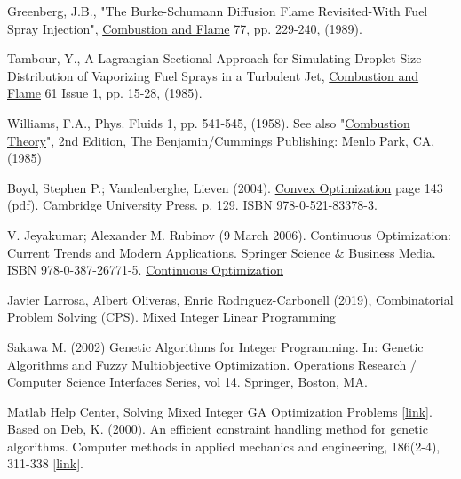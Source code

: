 \documentclass[12pt]{article}
\numberwithin{equation}{section}
\begin{document}
\begin{flushleft}
\begin{thebibliography}{9}
 \label{ga9}
Greenberg, J.B., "The Burke-Schumann Diffusion Flame Revisited-With Fuel Spray Injection", \href{https://www.sciencedirect.com/science/article/abs/pii/0010218089901314}{Combustion and Flame} 77, pp. 229-240, (1989).


 \label{ga10}
Tambour, Y., A Lagrangian Sectional Approach for Simulating Droplet Size Distribution of Vaporizing Fuel Sprays in a Turbulent Jet, \href{https://www.sciencedirect.com/science/article/abs/pii/0010218085901154}{Combustion and Flame} 61 Issue 1, pp. 15-28,
(1985).


 \label{ga11}
Williams, F.A., Phys. Fluids 1, pp. 541-545, (1958). See also "\href{https://www.routledge.com/Combustion-Theory/Williams/p/book/9780201407778}{Combustion Theory}", 2nd
Edition, The Benjamin/Cummings Publishing: Menlo Park, CA, (1985)


 \label{c1}
Boyd, Stephen P.; Vandenberghe, Lieven (2004). \href{https://web.stanford.edu/~boyd/cvxbook/bv_cvxbook.pdf#page=143}{Convex Optimization} page 143 (pdf). Cambridge University Press. p. 129. ISBN 978-0-521-83378-3. 


  \label{continuity} 
V. Jeyakumar; Alexander M. Rubinov (9 March 2006). Continuous Optimization: Current Trends and Modern Applications. Springer Science $\&$ Business Media. ISBN 978-0-387-26771-5.
\href{https://books.google.co.il/books?id=QePsbLIwwEoC&printsec=frontcover&dq=%22Continuous+optimization%22&hl=en&sa=X&redir_esc=y#v=onepage&q=%22Continuous%20optimization%22&f=false}{Continuous Optimization}


 \label{MILP_1}
Javier Larrosa, Albert Oliveras, Enric Rodrıguez-Carbonell (2019), Combinatorial Problem Solving (CPS). 
\href{https://www.cs.upc.edu/~erodri/webpage/cps/theory/lp/milp/slides.pdf}{Mixed Integer Linear Programming}


 \label{MILP_2}
Sakawa M. (2002) Genetic Algorithms for Integer Programming. In: Genetic Algorithms and Fuzzy Multiobjective Optimization. \href{https://link.springer.com/chapter/10.1007/978-1-4615-1519-7_5}{Operations Research} / Computer Science Interfaces Series, vol 14. Springer, Boston, MA. 


 \label{matlab_problem}
Matlab Help Center, Solving Mixed Integer GA Optimization Problems [\href{https://www.mathworks.com/help/gads/mixed-integer-optimization.html#bs1clc2}{link}]. Based on Deb, K. (2000). An efficient constraint handling method for genetic algorithms. Computer methods in applied mechanics and engineering, 186(2-4), 311-338 [\href{https://www.sciencedirect.com/science/article/pii/S0045782599003898}{link}].



\end{thebibliography}
\end{flushleft}
\end{document}
